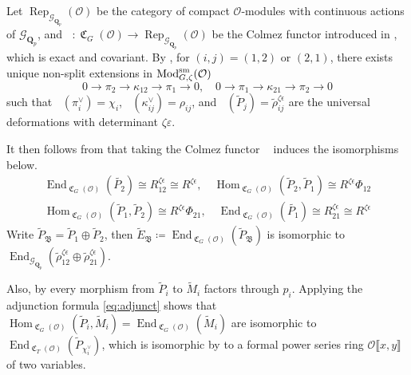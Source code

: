 \documentclass[leqno]{amsart}
\theoremstyle{definition}
\theoremstyle{remark}
\newcommand{\oo}{\mathcal{O}}
\newcommand{\Qp}{\mathbf{Q}_p}
\DeclareMathOperator{\End}{End}
\DeclareMathOperator{\Hom}{Hom}
\DeclareMathOperator{\Mod}{\textnormal{Mod}}
\DeclareMathOperator{\fC}{\mathfrak{C}} %
\DeclareMathOperator{\Rep}{Rep}
\DeclareMathOperator{\V}{\check{\mathbf{V}}} %
\newcommand{\Gp}{\mathcal{G}_{\Qp}} %
\newcommand{\B}{\mathfrak B} %
\newcommand{\sm}{\textnormal{sm}}
\begin{document}
Let $\Rep_{\Gp}(\oo)$
be the category of compact $\oo$-modules with
continuous actions of $\Gp$,
and $\V\colon \fC_G(\oo)\to \Rep_{\Gp}(\oo)$
be the Colmez functor introduced 
in \cite[\S 5.7]{pask},
which is exact and covariant.
By \cite[Cor 8.7]{pask},
for $(i,j)=(1,2)$ or  $(2,1)$,
there exists unique non-split extensions
in $\Mod^{\sm}_{G,\zeta}(\oo)$ 
\[
	0\to \pi_2\to \kappa_{12}\to \pi_1\to 0,\quad
	0\to \pi_1\to \kappa_{21}\to \pi_2\to 0
\]
such that
$\V(\pi_i^\vee)=\chi_i$, $\V(\kappa_{ij}^\vee)=\rho_{ij}$,
and $\V(\tilde{P}_j)=\tilde{\rho}^{\zeta\epsilon}_{ij}$
are the universal deformations
with determinant $\zeta\varepsilon$.

It then follows from \cite[Lem 8.10]{pask} that 
taking the Colmez functor 
$\V$ induces the isomorphisms below.
\begin{equation}\label{eq:end_deform}
\begin{split}
	\End_{\fC_{G}(\oo)}(\tilde{P_2})\cong 
    R^{\zeta\epsilon}_{12}\cong R^{\zeta\epsilon},\quad
	\Hom_{\fC_G(\oo)}(\tilde{P}_2, \tilde{P}_1)\cong
    R^{\zeta\epsilon}\Phi_{12}\\
	\Hom_{\fC_G(\oo)}(\tilde{P}_1, \tilde{P}_2)\cong
    R^{\zeta\epsilon}\Phi_{21},\quad
	\End_{\fC_{G}(\oo)}(\tilde{P_1})\cong 
    R^{\zeta\epsilon}_{21}\cong R^{\zeta\epsilon}
\end{split}
\end{equation}
Write $ \tilde{P}_\B=\tilde{P}_1\oplus \tilde{P}_2$,
then $\tilde{E}_\B\coloneqq
\End_{\fC_G(\oo)}(\tilde{P}_\B)$
is isomorphic to 
$\End_{\Gp}(\tilde{\rho}^{\zeta\epsilon}_{12}\oplus
\tilde{\rho}^{\zeta\epsilon}_{21})$.

Also,  by \cite[Prop 7.1]{pask}
every morphism from $\tilde{P}_i$ to $\tilde{M}_i$
factors through $p_i$.
Applying the adjunction formula \eqref{eq:adjunct} shows that
$\Hom_{\fC_G(\oo)}(\tilde{P}_i, \tilde{M}_i)=
\End_{\fC_G(\oo)}(\tilde{M}_i)$
are isomorphic to 
$\End_{\fC_T(\oo)}(\tilde{P}_{\chi_i^\vee})$,
which is isomorphic by \cite[Prop 3.34]{pask} to
a formal power series ring
$ \oo\llbracket x,y\rrbracket$
of two variables.
\end{document}
